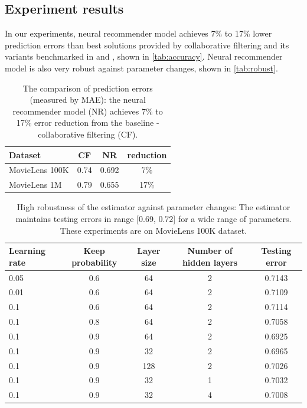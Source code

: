 \documentclass[twocolumn]{article}
\begin{document}
\subsection{Experiment results}
In our experiments, neural recommender model achieves 7\% to 17\% lower 
prediction errors than best solutions provided by collaborative filtering and 
its variants benchmarked in \cite{hwang2016efficient} and 
\cite{polatidis2016multi}, shown in \autoref{tab:accuracy}.
Neural recommender model is also very robust against 
parameter changes, shown in \autoref{tab:robust}.
\begin{table}[h]
	\centering
	\caption{The comparison of prediction errors (measured by MAE):
		the neural recommender model (NR) achieves 7\% to 17\% error reduction 
		from the baseline - collaborative filtering (CF).}
	\begin{tabularx}{0.5\textwidth}{ |X|c|c|c| }  \hline
		\textbf{Dataset} & \textbf{CF} & \textbf{NR} & \textbf{reduction} 
		\\ \hline
		MovieLens 100K & 0.74 & 0.692 & 7\% \\ \hline
		MovieLens 1M & 0.79 & 0.655 & 17\% \\ \hline
	\end{tabularx}
	\label{tab:accuracy}
\end{table}
\begin{table}[h]
	\centering
	\caption{High robustness of the estimator against parameter changes:
		The estimator maintains testing errors in range [0.69, 0.72] for a wide 
		range of parameters. These experiments are on MovieLens 100K dataset.}
	\begin{tabularx}{\textwidth}{ |X|c|c|c|c| } \hline
		 \textbf{Learning rate} & \textbf{Keep probability} & \textbf{Layer 
		 size} & \textbf{Number of hidden layers} & \textbf{Testing error} \\ 
		 \hline
		 0.05 & 0.6 & 64 & 2 & 0.7143 \\ \hline
		 0.01 & 0.6 & 64 & 2 & 0.7109 \\ \hline
		 0.1 & 0.6 & 64 & 2 & 0.7114 \\ \hline
		 0.1 & 0.8 & 64 & 2 & 0.7058 \\ \hline
		 0.1 & 0.9 & 64 & 2 & 0.6925 \\ \hline
		 0.1 & 0.9 & 32 & 2 & 0.6965 \\ \hline
		 0.1 & 0.9 & 128 & 2 & 0.7026 \\ \hline
		 0.1 & 0.9 & 32 & 1 & 0.7032 \\ \hline
		 0.1 & 0.9 & 32 & 4 & 0.7008 \\ \hline
	\end{tabularx}
	\label{tab:robust}
\end{table}
\end{document}
